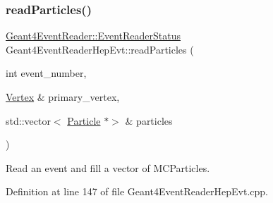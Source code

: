 \subsubsection{\texorpdfstring{read\+Particles()}{readParticles()}}
{\footnotesize\ttfamily \hyperlink{class_d_d4hep_1_1_simulation_1_1_geant4_event_reader_ae4f4bc83ffcf5b0c1868ad78859851e7}{Geant4\+Event\+Reader\+::\+Event\+Reader\+Status} Geant4\+Event\+Reader\+Hep\+Evt\+::read\+Particles (\begin{DoxyParamCaption}\item[{int}]{event\+\_\+number,  }\item[{\hyperlink{class_d_d4hep_1_1_simulation_1_1_geant4_event_reader_ac9738208fe520e5aa2ad1efa13de82e7}{Vertex} \&}]{primary\+\_\+vertex,  }\item[{std\+::vector$<$ \hyperlink{class_d_d4hep_1_1_simulation_1_1_geant4_event_reader_ad37f7aa722da2299517d66b4568a6a4a}{Particle} $\ast$$>$ \&}]{particles }\end{DoxyParamCaption})\hspace{0.3cm}{\ttfamily [virtual]}}



Read an event and fill a vector of M\+C\+Particles. 



Definition at line 147 of file Geant4\+Event\+Reader\+Hep\+Evt.\+cpp.



